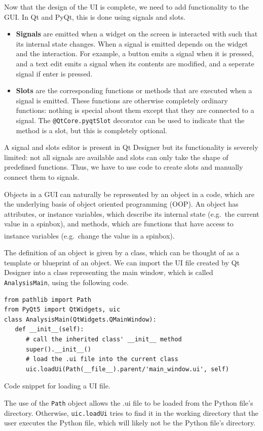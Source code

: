 \documentclass[12pt]{article}
\newenvironment{code}{\captionsetup{type=listing}}{\par\addvspace{\baselineskip}}
\begin{document}
Now that the design of the UI is complete, we need to add functionality to the GUI. In Qt and PyQt, this is done using signals and slots.
\begin{itemize}
    \item \textbf{Signals} are emitted when a widget on the screen is interacted with such that its internal state changes. When a signal is emitted depends on the widget and the interaction. For example, a button emits a signal when it is pressed, and a text edit emits a signal when its contents are modified, and a seperate signal if enter is pressed.
    \item \textbf{Slots} are the corresponding functions or methods that are executed when a signal is emitted. These functions are otherwise completely ordinary functions: nothing is special about them except that they are connected to a signal. The \texttt{@QtCore.pyqtSlot} decorator can be used to indicate that the method is a slot, but this is completely optional.
\end{itemize}

A signal and slots editor is present in Qt Designer but its functionality is severely limited: not all signals are available and slots can only take the shape of predefined functions. Thus, we have to use code to create slots and manually connect them to signals.

Objects in a GUI can naturally be represented by an object in a code, which are the underlying basis of object oriented programming (OOP). An object has attributes, or instance variables, which describe its internal state (e.g.~the current value in a spinbox), and methods, which are functions that have access to instance variables (e.g.~change the value in a spinbox).\textsuperscript{\cite{oop}}

The definition of an object is given by a class, which can be thought of as a template or blueprint of an object. We can import the UI file created by Qt Designer into a class representing the main window, which is called \texttt{AnalysisMain}, using the following code.
\begin{code}\begin{verbatim}
from pathlib import Path
from PyQt5 import QtWidgets, uic
class AnalysisMain(QtWidgets.QMainWindow):
   def __init__(self):
      # call the inherited class' __init__ method
      super().__init__()
      # load the .ui file into the current class
      uic.loadUi(Path(__file__).parent/'main_window.ui', self)
\end{verbatim}
\caption{Code snippet for loading a UI file.}
\label{lst:pyqt_uic}
\end{code}
The use of the \texttt{Path} object allows the .ui file to be loaded from the Python file's directory. Otherwise, \texttt{uic.loadUi} tries to find it in the working directory that the user executes the Python file, which will likely not be the Python file's directory.
\end{document}
